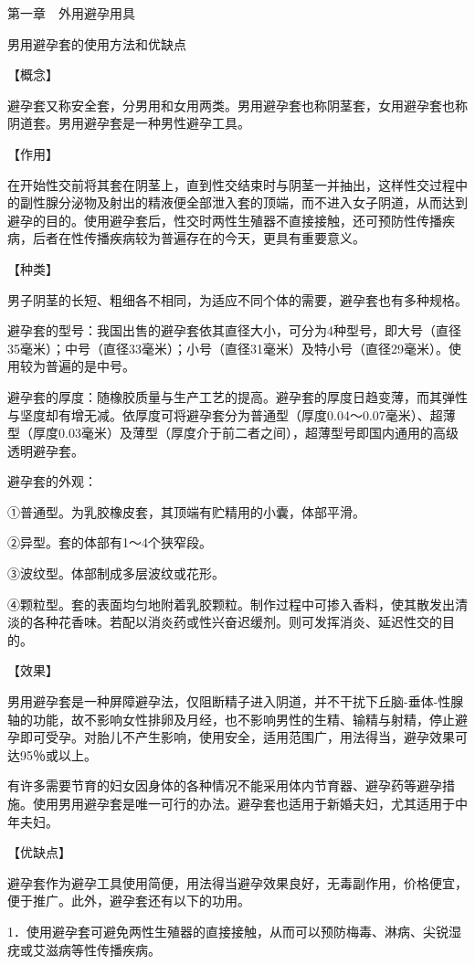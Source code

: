 \documentclass[12pt,UTF8]{ctexbook}
\begin{document}
第一章　外用避孕用具


男用避孕套的使用方法和优缺点


【概念】

避孕套又称安全套，分男用和女用两类。男用避孕套也称阴茎套，女用避孕套也称阴道套。男用避孕套是一种男性避孕工具。

【作用】

在开始性交前将其套在阴茎上，直到性交结束时与阴茎一并抽出，这样性交过程中的副性腺分泌物及射出的精液便全部泄入套的顶端，而不进入女子阴道，从而达到避孕的目的。使用避孕套后，性交时两性生殖器不直接接触，还可预防性传播疾病，后者在性传播疾病较为普遍存在的今天，更具有重要意义。

【种类】

男子阴茎的长短、粗细各不相同，为适应不同个体的需要，避孕套也有多种规格。

避孕套的型号：我国出售的避孕套依其直径大小，可分为4种型号，即大号（直径35毫米）；中号（直径33毫米）；小号（直径31毫米）及特小号（直径29毫米）。使用较为普遍的是中号。

避孕套的厚度：随橡胶质量与生产工艺的提高。避孕套的厚度日趋变薄，而其弹性与坚度却有增无减。依厚度可将避孕套分为普通型（厚度0.04～0.07毫米）、超薄型（厚度0.03毫米）及薄型（厚度介于前二者之间），超薄型号即国内通用的高级透明避孕套。

避孕套的外观：

①普通型。为乳胶橡皮套，其顶端有贮精用的小囊，体部平滑。

②异型。套的体部有1～4个狭窄段。

③波纹型。体部制成多层波纹或花形。

④颗粒型。套的表面均匀地附着乳胶颗粒。制作过程中可掺入香料，使其散发出清淡的各种花香味。若配以消炎药或性兴奋迟缓剂。则可发挥消炎、延迟性交的目的。

【效果】

男用避孕套是一种屏障避孕法，仅阻断精子进入阴道，并不干扰下丘脑-垂体-性腺轴的功能，故不影响女性排卵及月经，也不影响男性的生精、输精与射精，停止避孕即可受孕。对胎儿不产生影响，使用安全，适用范围广，用法得当，避孕效果可达95％或以上。

有许多需要节育的妇女因身体的各种情况不能采用体内节育器、避孕药等避孕措施。使用男用避孕套是唯一可行的办法。避孕套也适用于新婚夫妇，尤其适用于中年夫妇。

【优缺点】

避孕套作为避孕工具使用简便，用法得当避孕效果良好，无毒副作用，价格便宜，便于推广。此外，避孕套还有以下的功用。

1．使用避孕套可避免两性生殖器的直接接触，从而可以预防梅毒、淋病、尖锐湿疣或艾滋病等性传播疾病。
\end{document}
